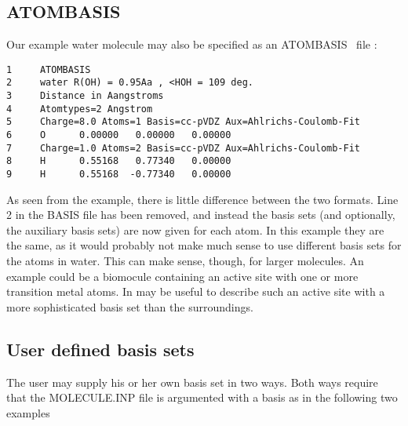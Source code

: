 \subsection{ATOMBASIS}
Our example water molecule may also be specified as an ATOMBASIS \mol\ file :
\begin{verbatim}
1     ATOMBASIS
2     water R(OH) = 0.95Aa , <HOH = 109 deg.
3     Distance in Aangstroms
4     Atomtypes=2 Angstrom
5     Charge=8.0 Atoms=1 Basis=cc-pVDZ Aux=Ahlrichs-Coulomb-Fit
6     O      0.00000   0.00000   0.00000
7     Charge=1.0 Atoms=2 Basis=cc-pVDZ Aux=Ahlrichs-Coulomb-Fit
8     H      0.55168   0.77340   0.00000
9     H      0.55168  -0.77340   0.00000
\end{verbatim} 
As seen from the example, there is little difference between the two
formats. Line 2 in the BASIS file has been removed, and instead the basis
sets (and optionally, the auxiliary basis sets) are now given for each
atom. In this example they are the same, as it would probably not make
much sense to use different basis sets for the atoms in water. This can
make sense, though, for larger molecules. An example could be a biomocule containing
an active site with one or more transition metal atoms. In may be useful to
describe such an active site with a more sophisticated basis set than the surroundings. 

\subsection{User defined basis sets}
\label{sub:USERDEFINER}

The user may supply his or her own basis set in two ways. Both ways require that the MOLECULE.INP file is argumented with a basis as in the following two examples

